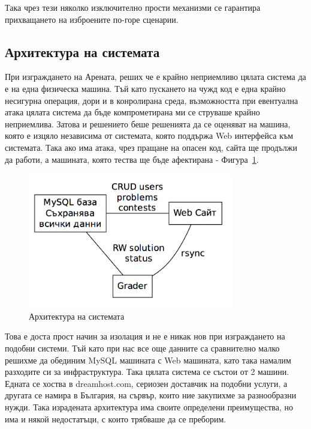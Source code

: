 \documentclass[a4paper,12pt]{article}
\begin{document}
  Така чрез тези няколко изключително прости механизми се гарантира прихващането на изброените по-горе сценарии.
  
  \subsection{Архитектура на системата}
  При изграждането на Арената, реших че е крайно неприемливо цялата система да е
  на една физическа машина. Тъй като пускането на чужд код е една крайно несигурна операция, дори и в конролирана среда, възможността при евентуална атака цялата система да бъде компрометирана ми се струваше крайно неприемлива. Затова и решението беше решенията да се оценяват на машина, която е изцяло независима от системата, която поддържа Web интерфейса към системата. Така ако има атака, чрез пращане на опасен код, сайта ще продължи да работи, а машината, която тества ще бъде афектирана - Фигура~\ref{architecture}.
  
  \begin{figure}
    \begin{center}
      \includegraphics[width=0.8\textwidth]{images/architecture.png}
    \end{center}
    \caption{Архитектура на системата}
    \label{architecture}
  \end{figure}
  
  Това е доста прост начин за изолация и не е никак нов при изграждането на подобни системи. Тъй като при нас все още данните са сравнително малко решихме да обединим MySQL машината с Web машината, като така намалим разходите си за инфраструктура. Така цялата система се състои от 2 машини. Едната се хоства в dreamhost.com, сериозен доставчик на подобни услуги, а другата се намира в България, на сървър, които ние закупихме за разнообразни нужди. Така израдената архитектура има своите определени преимущества, но има и някой недостатъци, с които трябваше да се преборим.
  
\end{document}
